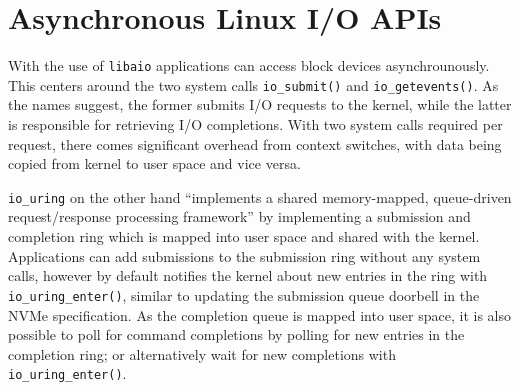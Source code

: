 \section{Asynchronous Linux I/O APIs}
With the use of \texttt{libaio} applications can access block devices asynchrounously. This centers around the two system calls \texttt{io\_submit()} and \texttt{io\_getevents()}. As the names suggest, the former submits I/O requests to the kernel, while the latter is responsible for retrieving I/O completions. With two system calls required per request, there comes significant overhead from context switches, with data being copied from kernel to user space and vice versa.

\texttt{io\_uring} on the other hand ``implements a shared memory-mapped, queue-driven request/response processing framework'' \cite{storage_api} by implementing a submission and completion ring which is mapped into user space and shared with the kernel. Applications can add submissions to the submission ring without any system calls, however by default notifies the kernel about new entries in the ring with \texttt{io\_uring\_enter()}, similar to updating the submission queue doorbell in the NVMe specification. As the completion queue is mapped into user space, it is also possible to poll for command completions by polling for new entries in the completion ring; or alternatively wait for new completions with \texttt{io\_uring\_enter()}.
